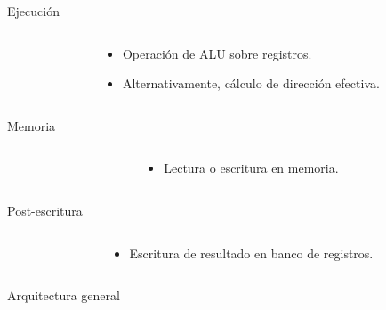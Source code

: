 \begin{frame}[t]{Ejecución}
\begin{columns}
\begin{column}{.5\textwidth}

\end{column}
\begin{column}{.5\textwidth}
\begin{itemize}
  \item Operación de ALU sobre registros.
  \item Alternativamente, cálculo de dirección efectiva.
\end{itemize}
\end{column}
\end{columns}
\end{frame}

\begin{frame}[t]{Memoria}
\begin{columns}
\begin{column}{.5\textwidth}
\begin{center}

\end{center}
\end{column}
\begin{column}{.5\textwidth}
\begin{itemize}
  \item Lectura o escritura en memoria.
\end{itemize}
\end{column}
\end{columns}
\end{frame}

\begin{frame}[t]{Post-escritura}
\begin{columns}
\begin{column}{.5\textwidth}

\end{column}
\begin{column}{.5\textwidth}
\begin{itemize}
  \item Escritura de resultado en banco de registros.
\end{itemize}
\end{column}
\end{columns}
\end{frame}

\begin{frame}[t]{Arquitectura general}

\end{frame}

